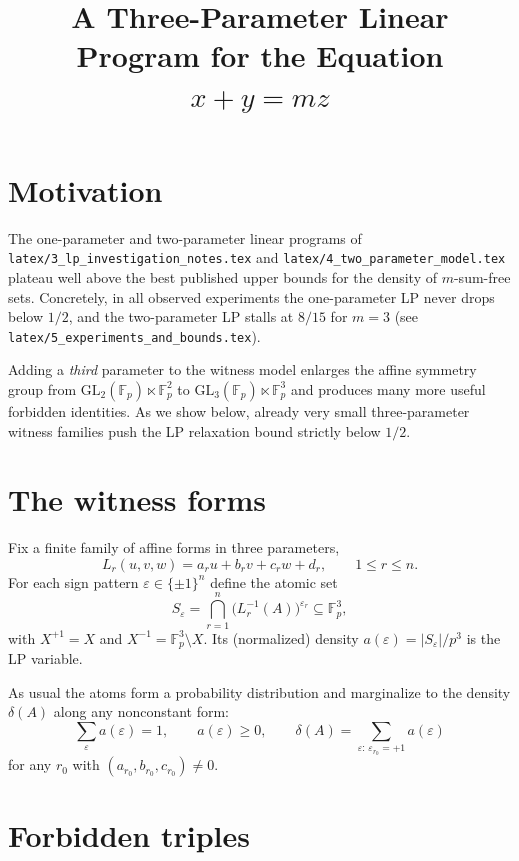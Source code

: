 \documentclass[11pt]{article}
\title{A Three-Parameter Linear Program for the Equation $x+y=mz$}
\author{}
\date{}
\begin{document}
\maketitle

\section{Motivation}

The one-parameter and two-parameter linear programs of
\texttt{latex/3\_lp\_investigation\_notes.tex} and
\texttt{latex/4\_two\_parameter\_model.tex} plateau well above the best
published upper bounds for the density of $m$-sum-free sets.
Concretely, in all observed experiments the one-parameter LP never drops below
$1/2$, and the two-parameter LP stalls at $8/15$ for $m=3$ (see
\texttt{latex/5\_experiments\_and\_bounds.tex}).

Adding a \emph{third} parameter to the witness model enlarges the affine
symmetry group from $\mathrm{GL}_2(\mathbb{F}_p)\ltimes\mathbb{F}_p^2$ to
$\mathrm{GL}_3(\mathbb{F}_p)\ltimes\mathbb{F}_p^3$ and produces many more
useful forbidden identities. As we show below, already very small three-parameter
witness families push the LP relaxation bound strictly below $1/2$.

\section{The witness forms}

Fix a finite family of affine forms in three parameters,
\[
L_r(u,v,w)=a_r u + b_r v + c_r w + d_r,\qquad 1\le r\le n.
\]
For each sign pattern $\varepsilon\in\{\pm 1\}^n$ define the atomic set
\[
S_\varepsilon
=
\bigcap_{r=1}^n\bigl(L_r^{-1}(A)\bigr)^{\varepsilon_r}\subseteq\mathbb{F}_p^3,
\]
with $X^{+1}=X$ and $X^{-1}=\mathbb{F}_p^3\setminus X$. Its (normalized) density
$a(\varepsilon)=|S_\varepsilon|/p^3$ is the LP variable.

As usual the atoms form a probability distribution and marginalize to the
density $\delta(A)$ along any nonconstant form:
\[
\sum_\varepsilon a(\varepsilon)=1,
\qquad
a(\varepsilon)\ge 0,
\qquad
\delta(A)=\sum_{\varepsilon:\,\varepsilon_{r_0}=+1}a(\varepsilon)
\]
for any $r_0$ with $(a_{r_0},b_{r_0},c_{r_0})\ne 0$.

\section{Forbidden triples}
\end{document}

